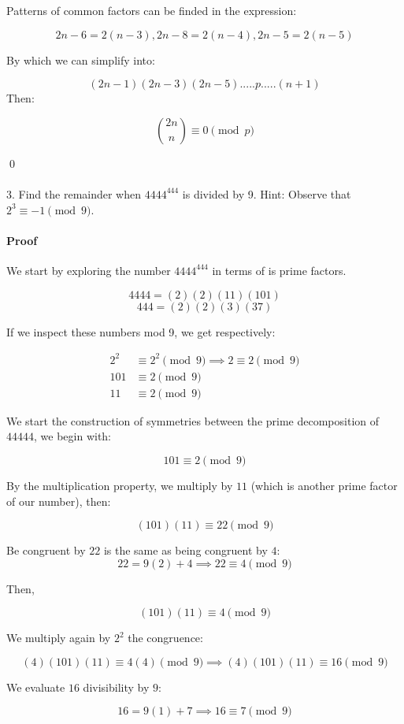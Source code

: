 \documentclass{article}
\begin{document}
Patterns of common factors can be finded in the expression:

$$2n-6=2(n-3), 2n-8=2(n-4), 2n-5 = 2(n-5)$$

By which we can simplify into:

$$(2n-1)(2n-3)(2n-5).....p.....(n+1)$$
Then:

$$ \binom{2n}{n} \equiv{0\pmod{p}}$$

\qed

\paragraph{}3. Find the remainder when $4444^{444}$ is divided by 9. Hint: Observe that $2^{3} \equiv -1\pmod{9}$.

\paragraph{Proof} We start by exploring the number $4444^{444}$ in terms of is prime factors.

$$4444 = (2)(2)(11)(101)$$
$$444 = (2)(2)(3)(37)$$

If we inspect these numbers mod 9, we get respectively:

\begin{align*}
  2^2 &\equiv 2^2 \pmod{9} \implies 2 \equiv 2 \pmod{9}\\
  101 &\equiv 2 \pmod{9}\\
  11 &\equiv 2 \pmod{9}
\end{align*}

We start the construction of symmetries between the prime decomposition of $44444$, we begin with:

$$101 \equiv 2 \pmod{9}$$

By the multiplication property, we multiply by $11$ (which is another prime factor of our number), then:

$$(101)(11) \equiv 22 \pmod{9}$$

Be congruent by $22$ is the same as being congruent by $4$:
$$22 = 9(2) + 4 \implies 22 \equiv 4 \pmod{9}$$

Then,

$$(101)(11) \equiv 4 \pmod{9}$$

We multiply again by $2^2$ the congruence:

$$(4)(101)(11) \equiv 4(4) \pmod{9} \implies (4)(101)(11) \equiv 16 \pmod{9}$$

We evaluate $16$ divisibility by $9$:

$$16 = 9(1) + 7 \implies 16 \equiv 7 \pmod{9}$$
\end{document}
